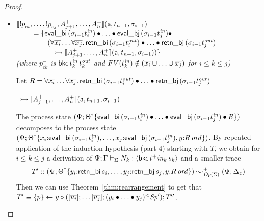 \begin{proof}
\begin{itemize}
\item $\llbracket {{!}p^-_{ci},\ldots,{!}p^-_{cj},A^+_{j+1},\ldots,A^+_n} \rrbracket({\sf a},{t_{n+1}},{\sigma_{i-1}})$
  \\
  $~ \qquad = \{ {\sf eval\_bi}\,({\sigma_{i-1}}t^{\it in}_i) 
                    \mathbin{\bullet}  \ldots \mathbin{\bullet}
                 {\sf eval\_bj}\,({\sigma_{i-1}}t^{\it in}_j) \mathbin{\bullet} ~$
  \\
  $~ \qquad \qquad (\forall\overline{x_i}\ldots\forall\overline{x_j}.\, 
     {\sf retn\_bi}\,(\sigma_{i-1}{t^{\it out}_i})
     \mathbin{\bullet} \ldots \mathbin{\bullet} 
     {\sf retn\_bj}\,(\sigma_{i-1}{t^{\it out}_j})$
  \\
  $~ \qquad \qquad \quad
   \rightarrowtail \llbracket {A^+_{j+1},\ldots,A^+_n} \rrbracket({\sf a},{t_{n+1}},{\sigma_{i-1}})) \}$\\
  {\it (where
   $p^-_{ck}$ is ${\sf bkc}\,t^{\it in}_k\,t^{\it out}_k$ 
   and $FV(t_k^{\it in}) \notin (\overline{x_i} \cup \ldots \cup \overline{x_j})$ 
   for $i \leq k \leq j$)}

  \bigskip
  Let $R = \forall\overline{x_i}\ldots\forall\overline{x_j}.\, 
     {\sf retn\_bi}\,(\sigma_{i-1}{t^{\it out}_i})
     \mathbin{\bullet} \ldots \mathbin{\bullet} 
     {\sf retn\_bj}\,(\sigma_{i-1}{t^{\it out}_j})$

   ~\qquad\qquad\qquad\qquad\quad $\rightarrowtail \llbracket {A^+_{j+1},\ldots,A^+_n} \rrbracket({\sf a},{t_{n+1}},{\sigma_{i-1}})$

  \smallskip

  The process state 
  $(\Psi; {{{\Theta}^\dag}}\{{{\sf eval\_bi}\,({\sigma_{i-1}}t^{\it in}_i) 
                    \mathbin{\bullet}  \ldots \mathbin{\bullet}
                 {\sf eval\_bj}\,({\sigma_{i-1}}t^{\it in}_j) \mathbin{\bullet} R}\})$
  decomposes to the process state
  $(\Psi; {{{\Theta}^\dag}}\{{x_i{:}{\sf eval\_bi}\,({\sigma_{i-1}}t^{\it in}_i), \ldots,
      x_j{:}{\sf eval\_bj}\,({\sigma_{i-1}}t^{\it in}_j),
      y{:}{R}\,{{\it ord}}}\})$. By repeated application of the induction hypothesis
  (part 4) starting with $T$, we obtain for $i \leq k \leq j$ a 
  derivation of ${\Psi}; {\Gamma} \vdash_{\Sigma} {N_k} : {\langle {{\sf bkc}\,t^+{\it in}_k\,s_k} \rangle}$
  and a smaller trace 
  \[T' :: (\Psi; {{{\Theta}^\dag}}\{{y_i{:}{\sf retn\_bi}\,s_i, \ldots,
      y_j{:}{\sf retn\_bj}\,s_j,
      y{:}{R}\,{{\it ord}}}\})
    \leadsto^+_{{\it Op}({\Sigma})}
    (\Psi; \Delta_z)\]
  Then we can use Theorem~\ref{thm:rearrangement}
  to get that 
  $T' \equiv \{{p}\} \leftarrow {y} \circ {([{\overline{u_i}}]; {\ldots
               [{\overline{u_j}}]; {
                 {{({y_i} \mathbin{\bullet}{{\ldots} \mathbin{\bullet}{y_j}})}{^{<}}{{\it Sp}'}}}})};
   T''$.


\end{itemize}
\end{proof}

